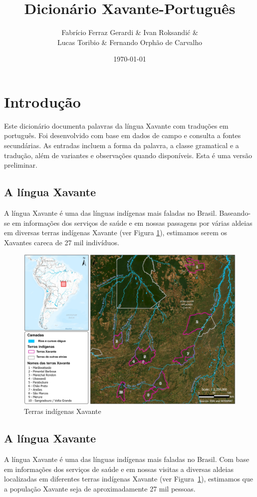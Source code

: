 \documentclass[12pt]{book}
\title{\textbf{Dicionário Xavante-Português}}
\author{Fabrício Ferraz Gerardi \& Ivan Roksandić \& \\ Lucas Toribio \& Fernando Orphão de Carvalho}
\date{\today}
\begin{document}
\frontmatter
\maketitle

\chapter*{Introdução}
Este dicionário documenta palavras da língua Xavante com traduções em português. Foi desenvolvido com base em dados de campo e consulta a fontes secundárias. As entradas incluem a forma da palavra, a classe gramatical e a tradução, além de variantes e observações quando disponíveis. Esta é uma versão preliminar.


\section*{A língua Xavante}

A língua Xavante é uma das línguas indígenas mais faladas no Brasil. Baseando-se em informações dos serviços de saúde e em nossas passagens por várias aldeias em diversas terras indígenas Xavante (ver Figura \ref{fig:XavTerras}), estimamos serem os Xavantes careca de 27 mil indivíduos.

\begin{figure}
    \centering
    \includegraphics[width=0.7\linewidth]{XavanteTerras.jpeg}
    \caption{Terras indígenas Xavante}
    \label{fig:XavTerras}
\end{figure}

\section*{A língua Xavante}

A língua Xavante é uma das línguas indígenas mais faladas no Brasil. Com base em informações dos serviços de saúde e em nossas visitas a diversas aldeias localizadas em diferentes terras indígenas Xavante (ver Figura~\ref{fig:XavTerras}), estimamos que a população Xavante seja de aproximadamente 27 mil pessoas.
\end{document}
